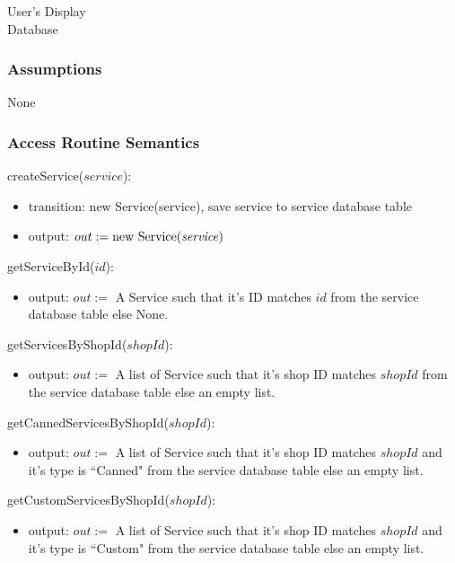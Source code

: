 \documentclass[12pt, titlepage]{article}
\begin{document}
User's Display \\ Database

\subsubsection{Assumptions}

None

\subsubsection{Access Routine Semantics}

\noindent createService($service$):
\begin{itemize}
	\item transition: new Service(service), save service to service database table
	\item output: $out := \text{new Service(\emph{service})}$
\end{itemize}

\noindent getServiceById($id$):
\begin{itemize}
	\item output: $out :=$ A Service such that it's ID matches $id$ from the service database table else
	      None.
\end{itemize}

\noindent getServicesByShopId($shopId$):
\begin{itemize}
	\item output: $out :=$ A list of Service such that it's shop ID matches $shopId$ from the service
	      database table else an empty list.
\end{itemize}

\noindent getCannedServicesByShopId($shopId$):
\begin{itemize}
	\item output: $out :=$ A list of Service such that it's shop ID matches $shopId$ and it's type is
	      ``Canned" from the service database table else an empty list.
\end{itemize}

\noindent getCustomServicesByShopId($shopId$):
\begin{itemize}
	\item output: $out :=$ A list of Service such that it's shop ID matches $shopId$ and it's type is
	      ``Custom" from the service database table else an empty list.
\end{itemize}
\end{document}
